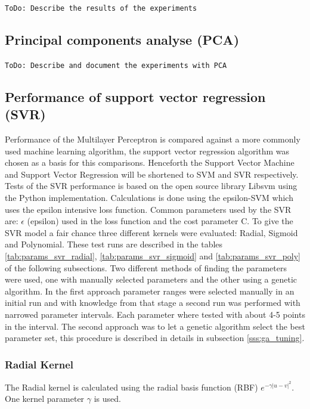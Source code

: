 \texttt{ToDo: Describe the results of the experiments}

\subsection{Principal components analyse (PCA)} \label{sss:pca_analyse}
\texttt{ToDo: Describe and document the experiments with PCA}

\subsection{Performance of support vector regression (SVR)} \label{sss:performance_svr}
Performance of the Multilayer Perceptron is compared against a more commonly used machine learning algorithm, the support vector regression algorithm was chosen as a basis for this comparisons. Henceforth the Support Vector Machine and Support Vector Regression will be shortened to SVM and SVR respectively. Tests of the SVR performance is based on the open source library Libsvm using the Python implementation. Calculations is done using the epsilon-SVM which uses the epsilon intensive loss function. Common parameters used by the SVR are: $\epsilon$ (epsilon) used in the loss function and the cost parameter C.
To give the SVR model a fair chance three different kernels were evaluated: Radial, Sigmoid and Polynomial. These test runs are described in the tables \ref{tab:params_svr_radial}, \ref{tab:params_svr_sigmoid} and \ref{tab:params_svr_poly} of the following subsections. Two different methods of finding the parameters were used, one with manually selected parameters and the other using a genetic algorithm. In the first approach parameter ranges were selected manually in an initial run and with knowledge from that stage a second run was performed with narrowed parameter intervals. Each parameter where tested with about 4-5 points in the interval. The second approach was to let a genetic algorithm select the best parameter set, this procedure is described in details in subsection \ref{sss:ga_tuning}.  

\subsubsection{Radial Kernel} \label{sss:performance_radial_svr}
The Radial kernel is calculated using the radial basis function (RBF) $e^{-\gamma|u-v|^{2}}$. One kernel parameter $\gamma$ is used.

